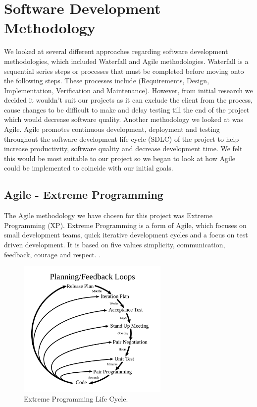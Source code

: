\section{Software Development Methodology}
We looked at several different approaches regarding software development methodologies, which included Waterfall and Agile methodologies. Waterfall is a sequential series steps or processes that must be completed before moving onto the following steps. These processes include (Requirements, Design, Implementation, Verification and Maintenance). However, from initial research we decided it wouldn't suit our projects as it can exclude the client from the process, cause changes to be difficult to make and delay testing till the end of the project which would decrease software quality. Another methodology we looked at was Agile. Agile promotes continuous development, deployment and testing throughout the software development life cycle (SDLC) of the project to help increase productivity, software quality and decrease development time. We felt this would be most suitable to our project so we began to look at how Agile could be implemented to coincide with our initial goals.

\subsection{Agile - Extreme Programming}
The Agile methodology we have chosen for this project was Extreme Programming (XP). Extreme Programming is a form of Agile, which focuses on small development teams, quick iterative development cycles and a focus on test driven development. It is based on five values simplicity, communication, feedback, courage and respect. \cite[p.~4]{1335275620040101}. 

\begin{figure}[h!]
	\caption{Extreme Programming Life Cycle.}
	\label{image:XP}
	\centering
	\includegraphics[width=0.65\textwidth]{Images/Extreme_Programming.png}
\end{figure}	

